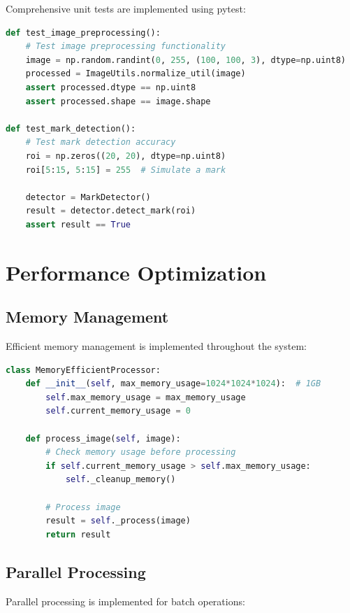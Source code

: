 Comprehensive unit tests are implemented using pytest:

\begin{lstlisting}[language=Python, caption=Unit Test Example]
def test_image_preprocessing():
    # Test image preprocessing functionality
    image = np.random.randint(0, 255, (100, 100, 3), dtype=np.uint8)
    processed = ImageUtils.normalize_util(image)
    assert processed.dtype == np.uint8
    assert processed.shape == image.shape

def test_mark_detection():
    # Test mark detection accuracy
    roi = np.zeros((20, 20), dtype=np.uint8)
    roi[5:15, 5:15] = 255  # Simulate a mark
    
    detector = MarkDetector()
    result = detector.detect_mark(roi)
    assert result == True
\end{lstlisting}

\section{Performance Optimization}

\subsection{Memory Management}

Efficient memory management is implemented throughout the system:

\begin{lstlisting}[language=Python, caption=Memory Management]
class MemoryEfficientProcessor:
    def __init__(self, max_memory_usage=1024*1024*1024):  # 1GB
        self.max_memory_usage = max_memory_usage
        self.current_memory_usage = 0
    
    def process_image(self, image):
        # Check memory usage before processing
        if self.current_memory_usage > self.max_memory_usage:
            self._cleanup_memory()
        
        # Process image
        result = self._process(image)
        return result
\end{lstlisting}

\subsection{Parallel Processing}

Parallel processing is implemented for batch operations:

